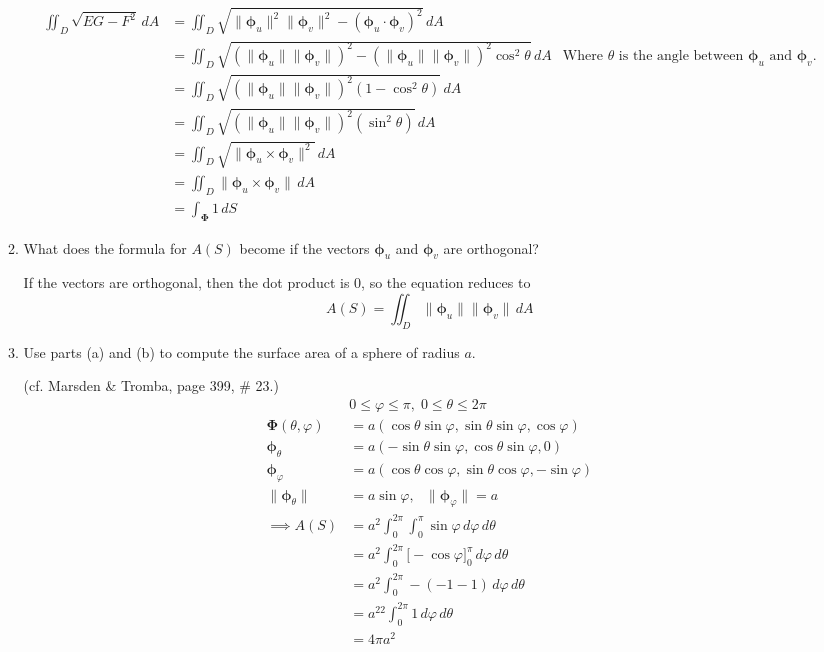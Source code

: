 \documentclass{article}
\newcommand{\norm}[1]{\| #1 \|}
\begin{document}
\begin{enumerate}
\begin{enumerate}
        \begin{align*}
            \iint_D \sqrt{EG - F^2}\,dA &= \iint_D \sqrt{\norm{\boldsymbol \phi_u}^2 \norm{\boldsymbol \phi_v}^2 - (\boldsymbol \phi_u \cdot \boldsymbol \phi_v)^2} \, dA \\
            &= \iint_D \sqrt{(\norm{\boldsymbol \phi_u}\norm{\boldsymbol \phi_v})^2 - (\norm{ \boldsymbol \phi_u} \norm{\boldsymbol \phi_v})^2 \cos^2\theta }\, dA & \text{Where $\theta$ is the angle between $\boldsymbol \phi_u$ and $\boldsymbol \phi_v$.}\\
            &= \iint_D \sqrt{(\norm{\boldsymbol \phi_u}\norm{\boldsymbol \phi_v})^2 (1 - \cos^2\theta) } \, dA \\
            &= \iint_D \sqrt{(\norm{\boldsymbol \phi_u}\norm{\boldsymbol \phi_v})^2 (\sin^2\theta) } \, dA \\
            &= \iint_D \sqrt{\norm{\boldsymbol \phi_u \times \boldsymbol \phi_v} ^2} \, dA \\
            &= \iint_D \norm{\boldsymbol \phi_u \times \boldsymbol \phi_v} \, dA \\
            &= \int_{\boldsymbol \Phi} 1\, dS
        \end{align*} 
        \item What does the formula for $A(S)$ become if the vectors $\boldsymbol \phi_u$ and $\boldsymbol \phi_v$ are orthogonal?


        If the vectors are orthogonal, then the dot product is 0, so the equation reduces to 
        \[ A(S) = \iint_D \norm{\boldsymbol \phi_u} \norm{\boldsymbol \phi_v}\, dA \]
        \item Use parts (a) and (b) to compute the surface area of a sphere of radius $a$.

        (cf. Marsden \& Tromba, page 399, \# 23.)
        \begin{align*}
            & 0 \leq \varphi \leq \pi , \; 0 \leq \theta \leq 2\pi \\
            \boldsymbol \Phi (\theta, \varphi) &= a(\cos \theta \sin \varphi, \sin \theta \sin \varphi, \cos \varphi) \\
            \boldsymbol \phi_\theta &= a(- \sin \theta \sin \varphi, \cos \theta \sin \varphi, 0) \\
            \boldsymbol \phi_\varphi &= a( \cos \theta \cos \varphi, \sin \theta \cos \varphi, -\sin \varphi) \\
            \norm{\boldsymbol \phi_\theta} &= a\sin \varphi, \: \: \: \norm{\boldsymbol \phi_\varphi} = a \\
            \implies A(S) &= a^2\int_0^{2\pi}\int_0^\pi \sin \varphi \, d\varphi \, d\theta \\
            &= a^2\int_0^{2\pi}\Big[- \cos \varphi \Big]_0^{\pi} \, d\varphi \, d\theta \\
            &= a^2\int_0^{2\pi}- (-1 - 1) \, d\varphi \, d\theta \\
            &= a^22\int_0^{2\pi}1 \, d\varphi \, d\theta \\
            &= 4\pi a^2\\
        \end{align*} 




\end{enumerate}
\end{enumerate}
\end{document}
